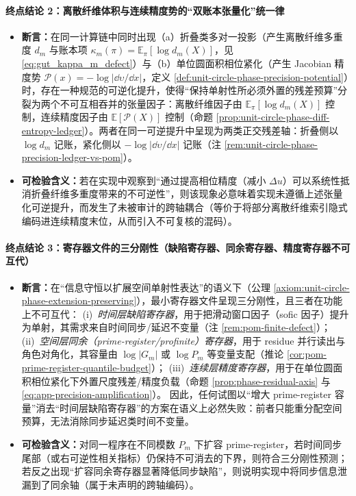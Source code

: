 \paragraph{终点结论 2：离散纤维体积与连续精度势的“双账本张量化”统一律}
\begin{itemize}
  \item \textbf{断言：}在同一计算链中同时出现（a）折叠类多对一投影（产生离散纤维多重度 \(d_m\) 与账本项 \(\kappa_m(\pi)=\mathbb{E}_\pi[\log d_m(X)]\)，见 \eqref{eq:gut_kappa_m_defect}）与（b）单位圆面积相位紧化（产生 Jacobian 精度势 \(\mathcal{P}(x)=-\log|\dd\upsilon/\dd x|\)，定义 \ref{def:unit-circle-phase-precision-potential}）时，存在一种规范的可逆化提升，使得“保持单射性所必须外置的残差预算”分裂为两个不可互相吞并的张量因子：离散纤维因子由 \(\mathbb{E}_\pi[\log d_m(X)]\) 控制，连续精度因子由 \(\mathbb{E}[\mathcal{P}(X)]\) 控制（命题 \ref{prop:unit-circle-phase-diff-entropy-ledger}）。两者在同一可逆提升中呈现为两类正交残差轴：折叠侧以 \(\log d_m\) 记账，紧化侧以 \(-\log|\dd\upsilon/\dd x|\) 记账（注 \ref{rem:unit-circle-phase-precision-ledger-vs-pom}）。
  \item \textbf{可检验含义：}若在实现中观察到“通过提高相位精度（减小 \(\Delta u\)）可以系统性抵消折叠纤维多重度带来的不可逆性”，则该现象必意味着实现未遵循上述张量化可逆提升，而发生了未被审计的跨轴耦合（等价于将部分离散纤维索引隐式编码进连续精度末位，从而引入不可复核的混码）。
\end{itemize}

\paragraph{终点结论 3：寄存器文件的三分刚性（缺陷寄存器、同余寄存器、精度寄存器不可互代）}
\begin{itemize}
  \item \textbf{断言：}在“信息守恒以扩展空间单射性表达”的语义下（公理 \ref{axiom:unit-circle-phase-extension-preserving}），最小寄存器文件呈现三分刚性，且三者在功能上不可互代：
  (i)~\emph{时间层缺陷寄存器}，用于把滑动窗口因子（sofic 因子）提升为单射，其需求来自时间同步/延迟不变量（注 \ref{rem:pom-finite-defect}）；
  (ii)~\emph{空间层同余（prime-register/profinite）寄存器}，用于 residue 并行读出与角色对角化，其容量由 \(\log|G_m|\) 或 \(\log P_m\) 等变量支配（推论 \ref{cor:pom-prime-register-quantile-budget}）；
  (iii)~\emph{连续层精度寄存器}，用于在单位圆面积相位紧化下外置尺度残差/精度负载（命题 \ref{prop:phase-residual-axis} 与 \eqref{eq:app-precision-amplification}）。
  因此，任何试图以“增大 prime-register 容量”消去“时间层缺陷寄存器”的方案在语义上必然失败：前者只能重分配空间预算，无法消除同步延迟类时间不变量。
  \item \textbf{可检验含义：}对同一程序在不同模数 \(P_m\) 下扩容 prime-register，若时间同步尾部（或右可逆性相关指标）仍保持不可消去的下界，则符合三分刚性预测；若反之出现“扩容同余寄存器显著降低同步缺陷”，则说明实现中将同步信息泄漏到了同余轴（属于未声明的跨轴编码）。
\end{itemize}

